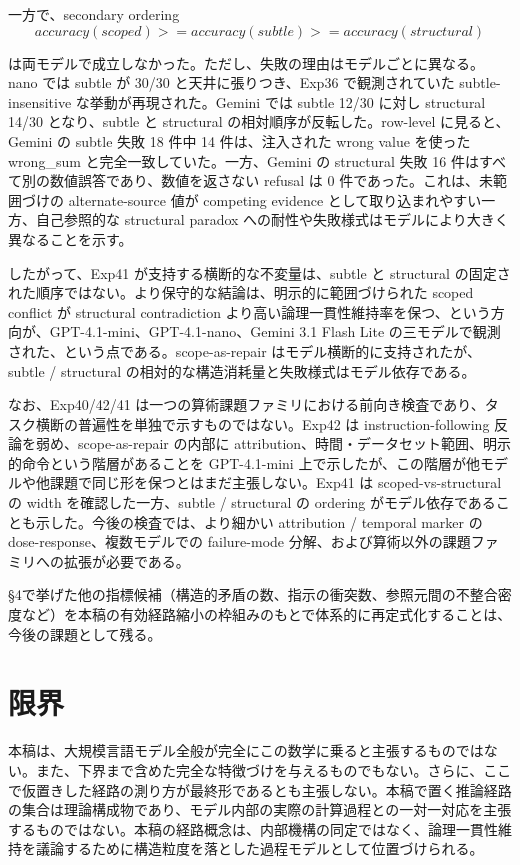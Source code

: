 \documentclass[12pt,a4paper]{article}
\begin{document}
一方で、secondary ordering \[
accuracy(scoped) >= accuracy(subtle) >= accuracy(structural)
\]

は両モデルで成立しなかった。ただし、失敗の理由はモデルごとに異なる。nano では subtle が 30/30 と天井に張りつき、Exp36 で観測されていた subtle-insensitive な挙動が再現された。Gemini では subtle 12/30 に対し structural 14/30 となり、subtle と structural の相対順序が反転した。row-level に見ると、Gemini の subtle 失敗 18 件中 14 件は、注入された wrong value を使った wrong\_sum と完全一致していた。一方、Gemini の structural 失敗 16 件はすべて別の数値誤答であり、数値を返さない refusal は 0 件であった。これは、未範囲づけの alternate-source 値が competing evidence として取り込まれやすい一方、自己参照的な structural paradox への耐性や失敗様式はモデルにより大きく異なることを示す。

したがって、Exp41 が支持する横断的な不変量は、subtle と structural の固定された順序ではない。より保守的な結論は、明示的に範囲づけられた scoped conflict が structural contradiction より高い論理一貫性維持率を保つ、という方向が、GPT-4.1-mini、GPT-4.1-nano、Gemini 3.1 Flash Lite の三モデルで観測された、という点である。scope-as-repair はモデル横断的に支持されたが、subtle / structural の相対的な構造消耗量と失敗様式はモデル依存である。

なお、Exp40/42/41 は一つの算術課題ファミリにおける前向き検査であり、タスク横断の普遍性を単独で示すものではない。Exp42 は instruction-following 反論を弱め、scope-as-repair の内部に attribution、時間・データセット範囲、明示的命令という階層があることを GPT-4.1-mini 上で示したが、この階層が他モデルや他課題で同じ形を保つとはまだ主張しない。Exp41 は scoped-vs-structural の width を確認した一方、subtle / structural の ordering がモデル依存であることも示した。今後の検査では、より細かい attribution / temporal marker の dose-response、複数モデルでの failure-mode 分解、および算術以外の課題ファミリへの拡張が必要である。

§4で挙げた他の指標候補（構造的矛盾の数、指示の衝突数、参照元間の不整合密度など）を本稿の有効経路縮小の枠組みのもとで体系的に再定式化することは、今後の課題として残る。

\section{限界}\label{ux9650ux754c}

本稿は、大規模言語モデル全般が完全にこの数学に乗ると主張するものではない。また、下界まで含めた完全な特徴づけを与えるものでもない。さらに、ここで仮置きした経路の測り方が最終形であるとも主張しない。本稿で置く推論経路の集合は理論構成物であり、モデル内部の実際の計算過程との一対一対応を主張するものではない。本稿の経路概念は、内部機構の同定ではなく、論理一貫性維持を議論するために構造粒度を落とした過程モデルとして位置づけられる。
\end{document}
